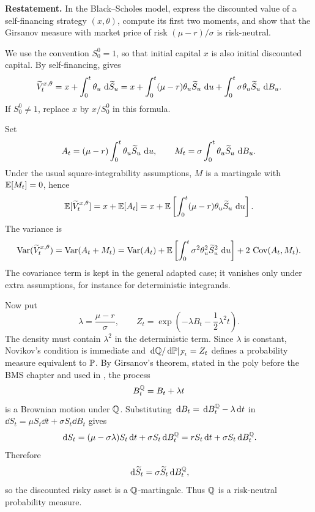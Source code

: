 \begin{exercise}
\textbf{Restatement.}
In the Black--Scholes model, express the discounted value of a self-financing
strategy \((x,\theta)\), compute its first two moments, and show that the
Girsanov measure with market price of risk \((\mu-r)/\sigma\) is risk-neutral.

\begin{solution}
We use the convention \(S^0_0=1\), so that initial capital \(x\) is also
initial discounted capital.  By self-financing,  gives
\[
  \Vtilde_t^{x,\theta}
    =x+\int_0^t\theta_u\,\dd\Stilde_u
    =x+\int_0^t(\mu-r)\theta_u\Stilde_u\,\dd u
      +\int_0^t\sigma\theta_u\Stilde_u\,\dd B_u.
\]
If \(S^0_0\ne1\), replace \(x\) by \(x/S^0_0\) in this formula.

Set
\[
  A_t=(\mu-r)\int_0^t\theta_u\Stilde_u\,\dd u,
  \qquad
  M_t=\sigma\int_0^t\theta_u\Stilde_u\,\dd B_u.
\]
Under the usual square-integrability assumptions, \(M\) is a martingale with
\(\E[M_t]=0\), hence
\[
  \E[\Vtilde_t^{x,\theta}]
    =x+\E[A_t]
    =x+\E\left[\int_0^t(\mu-r)\theta_u\Stilde_u\,\dd u\right].
\]
The variance is
\[
  \Var(\Vtilde_t^{x,\theta})
    =\Var(A_t+M_t)
    =\Var(A_t)+\E\left[\int_0^t\sigma^2\theta_u^2\Stilde_u^2\,\dd u\right]
      +2\,\Cov(A_t,M_t).
\]
The covariance term is kept in the general adapted case; it vanishes only
under extra assumptions, for instance for deterministic integrands.

Now put
\[
  \lambda=\frac{\mu-r}{\sigma},
  \qquad
  Z_t=\exp\left(-\lambda B_t-\frac12\lambda^2t\right).
\]
The density must contain \(\lambda^2\) in the deterministic term.  Since
\(\lambda\) is constant, Novikov's condition is immediate and
\(\dd\Q/\dd\P|_{\F_t}=Z_t\) defines a probability measure equivalent to
\(\P\).  By Girsanov's theorem, stated in the poly before the BMS chapter and
used in , the process
\[
  B_t^\Q=B_t+\lambda t
\]
is a Brownian motion under \(\Q\).  Substituting
\(\dd B_t=\dd B_t^\Q-\lambda\dd t\) in
\(\dd S_t=\mu S_t\dd t+\sigma S_t\dd B_t\) gives
\[
  \dd S_t
    =(\mu-\sigma\lambda)S_t\dd t+\sigma S_t\dd B_t^\Q
    =rS_t\dd t+\sigma S_t\dd B_t^\Q.
\]
Therefore
\[
  \dd\Stilde_t=\sigma\Stilde_t\dd B_t^\Q,
\]
so the discounted risky asset is a \(\Q\)-martingale.  Thus \(\Q\) is a
risk-neutral probability measure.
\end{solution}
\end{exercise}
